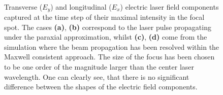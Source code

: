 \begin{figure}[h!]
	\centering
	\hspace{2mm}
	\\
	\hspace{2mm}
	\caption{Transverse ($ E_{y} $) and longitudinal ($ E_{x} $) electric laser field components captured at the time step of their maximal intensity in the focal spot. The cases \textbf{(a)}, \textbf{(b)} correspond to the laser pulse propagating under the paraxial approximation, whilst \textbf{(c)}, \textbf{(d)} come from the simulation where the beam propagation has been resolved within the Maxwell consistent approach. The size of the focus has been chosen to be one order of the magnitude larger than the center laser wavelength. One can clearly see, that there is no significant difference between the shapes of the electric field components.}
	\label{fig:5}
\end{figure}

